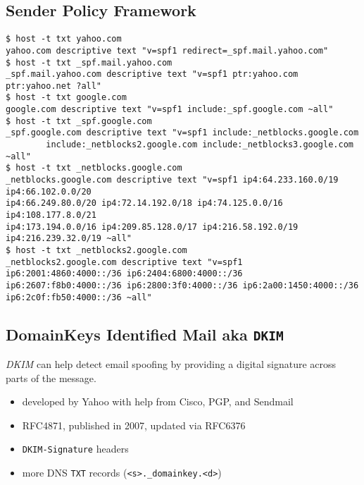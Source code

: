\documentclass[xga]{xdvislides}
\begin{document}
\subsection{Sender Policy Framework}
\begin{verbatim}
$ host -t txt yahoo.com
yahoo.com descriptive text "v=spf1 redirect=_spf.mail.yahoo.com"
$ host -t txt _spf.mail.yahoo.com
_spf.mail.yahoo.com descriptive text "v=spf1 ptr:yahoo.com ptr:yahoo.net ?all"
$ host -t txt google.com
google.com descriptive text "v=spf1 include:_spf.google.com ~all"
$ host -t txt _spf.google.com
_spf.google.com descriptive text "v=spf1 include:_netblocks.google.com
        include:_netblocks2.google.com include:_netblocks3.google.com ~all"
$ host -t txt _netblocks.google.com
_netblocks.google.com descriptive text "v=spf1 ip4:64.233.160.0/19 ip4:66.102.0.0/20
ip4:66.249.80.0/20 ip4:72.14.192.0/18 ip4:74.125.0.0/16 ip4:108.177.8.0/21
ip4:173.194.0.0/16 ip4:209.85.128.0/17 ip4:216.58.192.0/19 ip4:216.239.32.0/19 ~all"
$ host -t txt _netblocks2.google.com
_netblocks2.google.com descriptive text "v=spf1 ip6:2001:4860:4000::/36 ip6:2404:6800:4000::/36
ip6:2607:f8b0:4000::/36 ip6:2800:3f0:4000::/36 ip6:2a00:1450:4000::/36 ip6:2c0f:fb50:4000::/36 ~all"
\end{verbatim}

\subsection{DomainKeys Identified Mail aka {\tt DKIM}}
{\em DKIM} can help detect email spoofing by providing a
digital signature across parts of the message.

\begin{itemize}
	\item developed by Yahoo with help from Cisco, PGP, and Sendmail
	\item RFC4871, published in 2007, updated via RFC6376
	\item {\tt DKIM-Signature} headers
	\item more DNS {\tt TXT} records (\verb+<s>._domainkey.<d>+)
\end{itemize}
\end{document}
